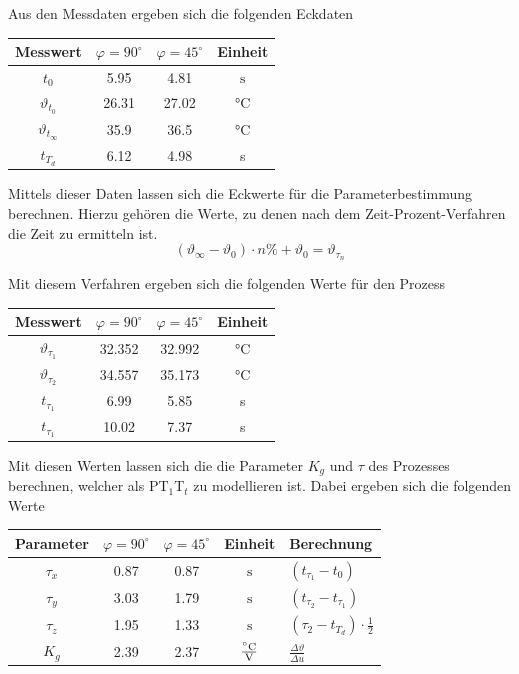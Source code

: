 Aus den Messdaten ergeben sich die folgenden Eckdaten
\begin{table}[h!]
	\centering
	\begin{tabular}{c c c c}
		Messwert
			& $\varphi = 90^\circ$
			& $\varphi = 45^\circ$
			& Einheit \\
		\hline
		$t_0$
			& 5.95
			& 4.81
			& $\si{\second}$ \\
		$\vartheta_{t_0}$
			& 26.31
			& 27.02
			& \si{\celsius} \\
		$\vartheta_{t_\infty}$
			& 35.9
			& 36.5
			& \si{\celsius} \\
		$t_{T_d}$
			& 6.12
			& 4.98
			& \si{\second} \\
	\end{tabular}
\end{table}

Mittels dieser Daten lassen sich die Eckwerte für die Parameterbestimmung
berechnen. Hierzu gehören die Werte, zu denen nach dem Zeit-Prozent-Verfahren
die Zeit zu ermitteln ist.
\[
	(\vartheta_\infty - \vartheta_0) \cdot n \% + \vartheta_0
	= \vartheta_{\tau_n}
\]

Mit diesem Verfahren ergeben sich die folgenden Werte für den Prozess
\begin{table}[h!]
	\centering
	\begin{tabular}{c c c c}
		Messwert
			& $\varphi = 90^\circ$
			& $\varphi = 45^\circ$
			& Einheit \\
		\hline
		$\vartheta_{\tau_1}$
			& 32.352
			& 32.992
			& $\si{\celsius}$ \\
		$\vartheta_{\tau_2}$
			& 34.557
			& 35.173
			& \si{\celsius} \\
		$t_{\tau_1}$
			& 6.99
			& 5.85
			& \si{\second} \\
		$t_{\tau_1}$
			& 10.02
			& 7.37
			& \si{\second} \\
	\end{tabular}
\end{table}

Mit diesen Werten lassen sich die die Parameter $K_g$ und $\tau$ des Prozesses
berechnen, welcher als PT$_1$T$_t$ zu modellieren ist. Dabei ergeben sich die
folgenden Werte
\begin{table}[h!]
	\centering
	\begin{tabular}{c c c c | l}
		Parameter
			& $\varphi = 90^\circ$
			& $\varphi = 45^\circ$
			& Einheit
			& Berechnung \\
		\hline
		$\tau_x$
			& 0.87
			& 0.87
			& $\si{\second}$
			& $(t_{\tau_1} - t_0)$ \\
		$\tau_y$
			& 3.03
			& 1.79
			& $\si{\second}$
			& $(t_{\tau_2} - t_{\tau_1})$ \\
		$\tau_z$
			& 1.95
			& 1.33
			& $\si{\second}$
			& $(\tau_2 - t_{T_d}) \cdot \frac{1}{2}$ \\
		$K_g$
			& 2.39
			& 2.37
			& $\si[per-mode=fraction]{\celsius\per\volt}$
			& $\frac{\Delta \vartheta}{\Delta u}$
	\end{tabular}
\end{table}

